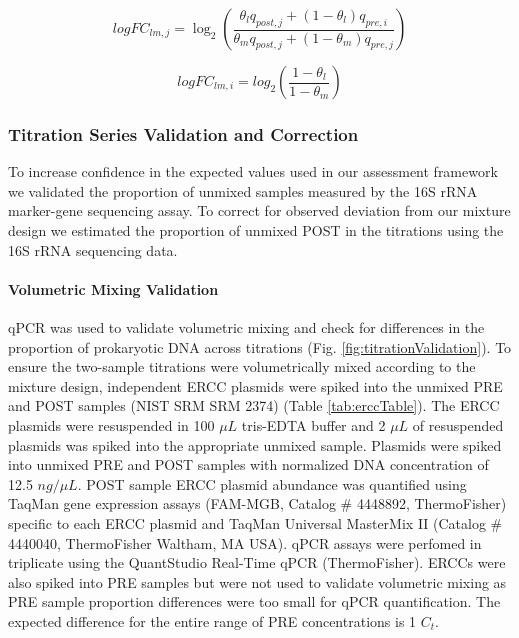 \documentclass{bmcart}
\begin{document}
\begin{equation}
      logFC_{lm,j} = \log_2\left(\frac{\theta_l q_{post,j} + (1 - \theta_l) q_{pre,i}}{\theta_m q_{post,j} + (1 - \theta_m) q_{pre,j}}\right)
  \label{eq:expLogFC}
\end{equation}

\begin{equation}
      logFC_{lm,i} = log_2\left(\frac{1-\theta_l}{1-\theta_m}\right)
  \label{eq:expPreLogFC}
\end{equation}

\subsubsection*{Titration Series Validation and Correction}
To increase confidence in the expected values used in our assessment framework we validated the proportion of unmixed samples measured by the 16S rRNA marker-gene sequencing assay.
To correct for observed deviation from our mixture design we estimated the proportion of unmixed POST in the titrations using the 16S rRNA sequencing data.

\paragraph*{Volumetric Mixing Validation}

qPCR was used to validate volumetric mixing and check for differences in
the proportion of prokaryotic DNA across titrations
(Fig. \ref{fig:titrationValidation}). To ensure the two-sample titrations
were volumetrically mixed according to the mixture design,
independent ERCC plasmids were spiked into the unmixed PRE and
POST samples \cite{baker2005external} (NIST SRM SRM 2374) (Table
\ref{tab:erccTable}). The ERCC plasmids were resuspended in 100
\(\mu L\) tris-EDTA buffer and 2 \(\mu L\) of resuspended plasmids was
spiked into the appropriate unmixed sample. Plasmids were spiked into
unmixed PRE and POST samples with normalized DNA concentration of
12.5 \(ng/\mu L\). POST sample ERCC plasmid abundance was quantified
using TaqMan gene expression assays (FAM-MGB, Catalog \# 4448892,
ThermoFisher) specific to each ERCC plasmid and TaqMan Universal
MasterMix II (Catalog \# 4440040, ThermoFisher Waltham, MA USA).
qPCR assays were perfomed in triplicate using the QuantStudio
Real-Time qPCR (ThermoFisher). ERCCs were also spiked into PRE
samples but were not used to validate volumetric mixing as PRE sample
proportion differences were too small for qPCR quantification.
The expected difference for the entire range of PRE concentrations
is 1 \(C_t\).
\end{document}
